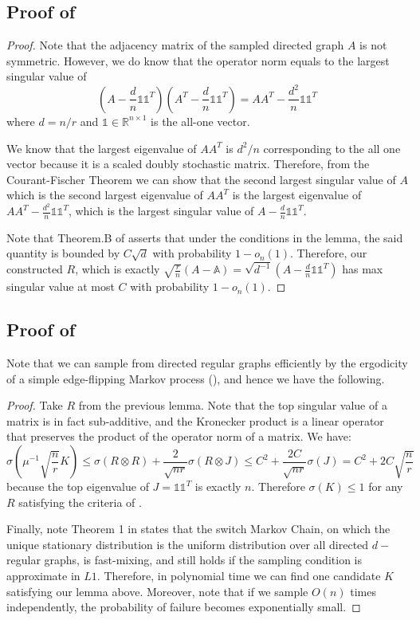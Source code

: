 \documentclass[final,12pt]{colt2023} %
\newcommand\1[1]{\mathbb{I}_{\left\{#1\right\}}}
\newcommand{\one}{\mathds{1}}
\begin{document}
\subsection{Proof of }
\begin{proof}
Note that the adjacency matrix of the sampled directed graph $A$ is not symmetric. However, we do know that the operator norm equals to the largest singular value of $$(A-\frac{d}{n}\one\one^T)(A^T-\frac{d}{n}\one\one^T)=AA^T-\frac{d^2}{n}\one\one^T$$where $d=n/r$ and $\one\in\mathbb{R}^{n\times 1}$ is the all-one vector.

\spac
We know that the largest eigenvalue of $AA^T$ is $d^2/n$ corresponding to the all one vector because it is a scaled doubly stochastic matrix. Therefore, from the Courant-Fischer Theorem we can show that the second largest singular value of $A$ which is the second largest eigenvalue of $AA^T$ is the largest eigenvalue of $AA^T-\frac{d^2}{n}\one\one^T$, which is the largest singular value of $A-\frac{d}{n}\one\one^T$.

\spac
Note that Theorem.B of  \cite{RegGraphSpectral} asserts that under the conditions in the lemma, the said quantity is bounded by $C\sqrt{d}$ with probability $1-o_n(1)$. Therefore, our constructed $R$, which is exactly $\sqrt{\frac{r}{n}}(A-\mathbb{A})=\sqrt{d^{-1}}(A-\frac{d}{n}\one\one^T)$ has max singular value at most $C$ with probability $1-o_n(1)$.
\end{proof}
\subsection{Proof of }
Note that we can sample from directed regular graphs efficiently by the ergodicity of a simple edge-flipping Markov process (\cite{MixReg1,MixReg2}), and hence we have the following.
\begin{proof}
Take $R$ from the previous lemma.
Note that the top singular value of a matrix is in fact sub-additive, and the Kronecker product is a linear operator that preserves the product of the operator norm of a matrix. We have:
    $$\sigma(\mu^{-1}\sqrt{\frac{n}{r}}K)\leq \sigma(R\otimes R)+\frac{2}{\sqrt{nr}}\sigma(R\otimes J)\leq C^2+\frac{2C}{\sqrt{nr}}\sigma(J)=C^2+2C\sqrt{\frac{{n}}{r}}$$because the top eigenvalue of $J=\one\one^T$ is exactly $n$.
    Therefore $\sigma(K)\leq 1$ for any $R$ satisfying the criteria of .
    
    \spac Finally, note Theorem 1 in \cite{MixReg1} states that the switch Markov Chain, on which the unique stationary distribution is the uniform distribution over all directed $d-$regular graphs, is fast-mixing, and  still holds if the sampling condition is approximate in $L1$. Therefore, in polynomial time we can find one candidate $K$ satisfying our lemma above. Moreover, note that if we sample $O(n)$ times independently, the probability of failure becomes exponentially small.
\end{proof}
\end{document}
